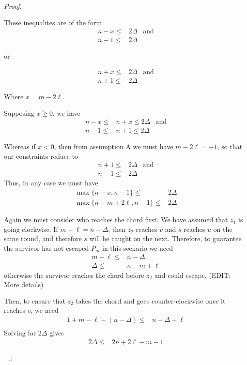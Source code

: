 \documentclass[letterpaper, 10pt]{article}
\begin{document}
\begin{proof}
\begin{proofpart}
These inequalites are of the form
\begin{align*}
  n-x \leq & 2 \Delta & \text{and} \\
  n-1 \leq & 2\Delta
\end{align*}
\begin{center}or\end{center}
\begin{align*}
n + x \leq & 2 \Delta & \text{and} \\
n + 1 \leq & 2 \Delta
\end{align*}

Where $x = m -2\ell$.

Supposing $x\geq 0$, we have
\begin{align*}
n-x \leq & n+x \leq 2 \Delta & \text{and} \\
n-1 \leq & n+1 \leq 2\Delta
\end{align*}

Whereas if $x <0$, then from assumption A we must have $m-2\ell = -1$, so that
our constraints reduce to
\begin{align*}
  n+1 \leq & 2 \Delta & \text{and}\\
  n-1 \leq & 2 \Delta
\end{align*}
Thus, in any case we must have
\begin{align*}
  \max\{ n-x, n-1 \} \leq & 2 \Delta \\
  \max\{ n -m + 2\ell, n-1 \} \leq & 2 \Delta
\end{align*}

Again we must consider who reaches the chord first. We have assumed that $z_1$ is going clockwise. If $m - \ell = n - \Delta$, then $z_2$ reaches $v$ and $s$ reaches $u$ on the same round, and therefore $s$ will be caught on the next. Therefore, to guarantee the survivor has not escaped $P_m$ in this scenario we need
\begin{align*}
  m - \ell \leq & n - \Delta \\
  \Delta \leq & n - m + \ell
\end{align*}
otherwise the survivor reaches the chord before $z_2$ and
could escape. (EDIT: More details)

Then, to ensure that $z_2$ takes the chord and goes counter-clockwise once
it reaches $v$, we need
\begin{align*}
  1 + m - \ell - (n - \Delta) \leq & n - \Delta + \ell \\
\end{align*}
Solving for $2\Delta$ gives
\begin{align*}
  2 \Delta \leq & 2n + 2\ell - m - 1
\end{align*}


\end{proofpart}
\end{proof}
\end{document}
